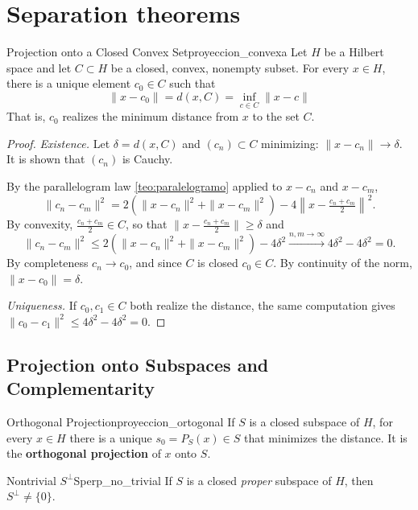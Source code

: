 \documentclass[11pt, a4paper]{article}
\begin{document}
\newpage

\section{Separation theorems}

\begin{teorema}{Projection onto a Closed Convex Set}{proyeccion_convexa}
Let $H$ be a Hilbert space and let $C \subset H$ be a closed, convex, nonempty subset.
For every $x \in H$, there is a unique element $c_0 \in C$ such that
$$ \|x - c_0\| = d(x, C) = \inf_{c \in C} \|x - c\| $$
That is, $c_0$ realizes the minimum distance from $x$ to the set $C$.
\end{teorema}

\begin{proof}
\textit{Existence.} Let $\delta = d(x, C)$ and $(c_n) \subset C$ minimizing:
$\|x - c_n\| \to \delta$. It is shown that $(c_n)$ is Cauchy.

By the parallelogram law \ref{teo:paralelogramo} applied to $x - c_n$ and $x - c_m$,
$$ \|c_n - c_m\|^2 = 2(\|x - c_n\|^2 + \|x - c_m\|^2) - 4\left\|x - \tfrac{c_n + c_m}{2}\right\|^2.
$$
By convexity, $\tfrac{c_n + c_m}{2} \in C$, so that $\|x - \tfrac{c_n + c_m}{2}\| \ge \delta$ and
$$ \|c_n - c_m\|^2 \le 2(\|x - c_n\|^2 + \|x - c_m\|^2) - 4\delta^2 \xrightarrow{n,m \to \infty}
4\delta^2 - 4\delta^2 = 0. $$
By completeness $c_n \to c_0$, and since $C$ is closed $c_0 \in C$. By continuity of the norm,
$\|x - c_0\| = \delta$.

\textit{Uniqueness.} If $c_0, c_1 \in C$ both realize the distance, the same computation gives
$\|c_0 - c_1\|^2 \le 4\delta^2 - 4\delta^2 = 0$.
\end{proof}

\subsection{Projection onto Subspaces and Complementarity}

\begin{corolario}{Orthogonal Projection}{proyeccion_ortogonal}
If $S$ is a closed subspace of $H$, for every $x \in H$ there is a unique $s_0 = P_S(x) \in S$
that minimizes the distance. It is the \textbf{orthogonal projection} of $x$ onto $S$.
\end{corolario}

\begin{corolario}{Nontrivial $S^\perp$}{Sperp_no_trivial}
If $S$ is a closed \emph{proper} subspace of $H$, then $S^\perp \ne \{0\}$.
\end{corolario}
\end{document}
